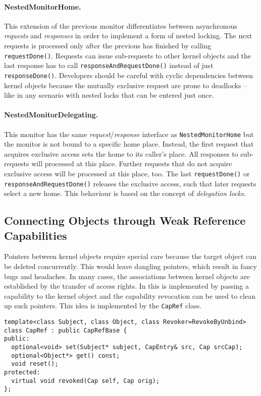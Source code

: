 \paragraph{NestedMonitorHome.}
This extension of the previous monitor differentiates between
asynchronous \emph{requests} and \emph{responses} in order to
implement a form of nested locking.  The next requests is processed
only after the previous has finished by calling
\texttt{requestDone()}.  Requests can issue sub-requests to other
kernel objects and the last response has to call
\texttt{responseAndRequestDone()} instead of just
\texttt{responseDone()}.  Developers should be careful with cyclic
dependencies between kernel objects because the mutually exclusive
request are prone to deadlocks -- like in any scenario with nested
locks that can be entered just once.

\paragraph{NestedMonitorDelegating.}
This monitor has the same \emph{request}/\emph{response} interface as \texttt{NestedMonitorHome} but
the monitor is not bound to a specific home place.  Instead, the first
request that acquires exclusive access sets the home to its caller's
place.  All responses to sub-requests will processed at this
place.  Further requests that do not acquire exclusive access will be
processed at this place, too.  The last \texttt{requestDone()} or
\texttt{responseAndRequestDone()} releases the exclusive access, such
that later requests select a new home.  This behaviour is based on the
concept of \emph{delegation locks}.


\subsection{Connecting Objects through Weak Reference Capabilities}

Pointers between kernel objects require special care because the
target object can be deleted concurrently.  This would leave dangling
pointers, which result in fancy bugs and headaches.  In many cases,
the associations between kernel objects are established by the
transfer of access rights.  In \mythos this is implemented by passing
a capability to the kernel object and the capability revocation can be
used to clean up such pointers.  This idea is implemented by the
\texttt{CapRef} class.

\begin{lstlisting}[float, label=lst:capref, caption=The weak reference capability interface.]
template<class Subject, class Object, class Revoker=RevokeByUnbind>
class CapRef : public CapRefBase {
public:
  optional<void> set(Subject* subject, CapEntry& src, Cap srcCap);
  optional<Object*> get() const;
  void reset();
protected:
  virtual void revoked(Cap self, Cap orig);
};   
\end{lstlisting}

